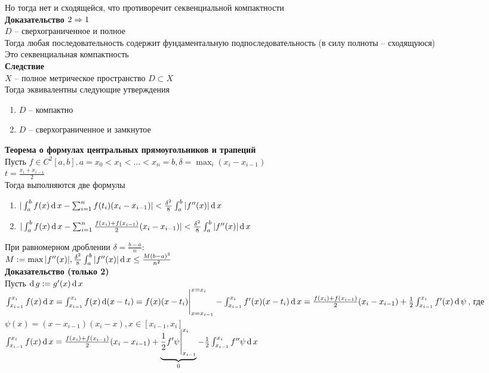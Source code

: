 \documentclass[12pt]{article}
\begin{document}
Но тогда нет и сходящейся, что противоречит секвенциальной компактности\\
\textbf{Доказательство $2 \Rto 1$}\\
$D$ -- сверхограниченное и полное\\
Тогда любая последовательность содержит фундаментальную подпоследовательность (в силу полноты -- сходящуюся)\\
Это секвенциальная компактность\\
\textbf{Следствие}\\
$X$ -- полное метрическое пространство $D \subset X$\\
Тогда эквивалентны следующие утверждения
\begin{enumerate}
    \item $D$ -- компактно
    \item $D$ -- сверхограниченное и замкнутое
\end{enumerate}
\textbf{Теорема о формулах центральных прямоугольников и трапеций}\\
Пусть $f \in C^2[a,b], a=x_0 < x_1 < \ldots < x_n = b, \delta = \max_i (x_i - x_{i-1})$\\
$t = \frac{x_i + x_{i-1}}2$\\
Тогда выполняются две формулы
\begin{enumerate}
    \item $| \int_a^b f(x)\df x - \sum_{i=1}^n f(t_i)(x_i-x_{i-1})| < \frac{\delta^2}8 \int_a^b |f''(x)|\df x$
    \item $| \int_a^b f(x)\df x - \sum_{i=1}^n \frac{f(x_i) + f(x_{i-1})}2 (x_i - x_{i-1})| < \frac{\delta^2}8 \int_a^b |f''(x)| \df x$
\end{enumerate}
При равномерном дроблении $\delta = \frac{b-a}n:$\\
$M:= \max |f''(x)|, \frac{\delta^2}8 \int_a^b |f''(x)| \df x \leq \frac{M(b-a)^3}{n^2}$\\
\textbf{Доказательство (только 2)}\\
Пусть $\df g:= g'(x) \df x$\\
$\int_{x_{i-1}}^{x_i} f(x)\df x = \int_{x_{i-1}}^{x_i} f(x) \df (x-t_i) = f(x)(x-t_i)\vl_{x=x_{i-1}}^{x=x_i} - \int_{x_{i-1}}^{x_i} f'(x)(x-t_i)\df x = \frac{f(x_i)+f(x_{i-1})}2(x_i-x_{i-1}) + \frac12\int_{x_{i-1}}^{x_i} f'(x)\df \psi$, где $\psi(x) = (x-x_{i-1})(x_i-x), x \in [x_{i-1}, x_i]$\\
$\int_{x_{i-1}}^{x_i} f(x)\df x = \frac{f(x_i)+f(x_{i-1})}2(x_i-x_{i-1}) + \ub{0}{\frac12 f'\psi\vl_{x_{i-1}}^{x_i}} - \frac12 \int_{x_{i-1}}^{x_i} f''\psi \df x$\\
\end{document}
